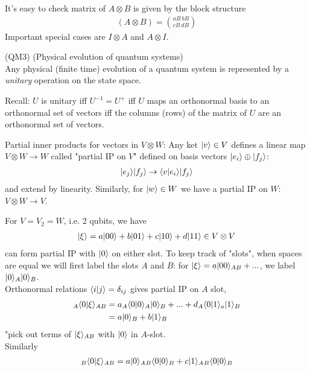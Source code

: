 \documentclass[a4paper]{article}
\begin{document}
It's easy to check matrix of $A \otimes B$ is given by the block structure
\begin{equation*}
\begin{aligned}
(A \otimes B) = {{aB \ bB} \choose {cB \ dB}}
\end{aligned}
\end{equation*}
Important special cases are $I \otimes A$ and $A \otimes I$.

(QM3) (Physical evolution of quantum systems)\\
Any physical (finite time) evolution of a quantum system is represented by a \emph{unitary} operation on the state space.

Recall: $U$ is unitary iff $U^{-1} = U^+$ iff $U$ maps an orthonormal basis to an orthonormal set of vectors iff the columns (rows) of the matrix of $U$ are an orthonormal set of vectors.

Partial inner products for vectors in $V \otimes W$: Any ket $|v\rangle \in V$ defines a linear map $V \otimes W \to W$ called "partial IP on $V$" defined on basis vectors $|e_i \rangle \oplus |f_j\rangle$:
\begin{equation*}
\begin{aligned}
|e_j \rangle |f_j \rangle \to \langle v|e_i\rangle |f_j\rangle
\end{aligned}
\end{equation*}
and extend by linearity. Similarly, for $|w\rangle \in W$ we have a partial IP on $W$: $V \otimes W \to V$.

\begin{eg}
For $V = V_2 = W$, i.e. 2 qubits, we have
\begin{equation*}
\begin{aligned}
|\xi\rangle = a|00\rangle+b|01\rangle+c|10\rangle+d|11\rangle \in V\otimes V
\end{aligned}
\end{equation*}
can form partial IP with $|0\rangle$ on either slot. To keep track of "slots", when spaces are equal we will first label the slots $A$ and $B$: for $|\xi\rangle = a|00\rangle_{AB} + ...$, we label $|0\rangle_A |0\rangle_B$.\\
Orthonormal relations $\langle i |j \rangle = \delta_{ij}$ gives partial IP on $A$ slot,
\begin{equation*}
\begin{aligned}
{}_A\langle 0|\xi\rangle_{AB} &= a{}_A\langle 0|0 \rangle_A |0\rangle_B + ... + d {}_A\langle 0|1 \rangle_a |1\rangle_B\\
&= a|0\rangle_B + b|1\rangle_B
\end{aligned}
\end{equation*}
"pick out terms of $|\xi\rangle_{AB}$ with $|0\rangle$ in $A$-slot.\\
Similarly
\begin{equation*}
\begin{aligned}
{}_B\langle 0|\xi\rangle_{AB} = a|0\rangle_A {}_B\langle 0|0\rangle_B + c|1\rangle_A {}_B \langle 0|0 \rangle_B
\end{aligned}
\end{equation*}
\end{eg}
\end{document}
